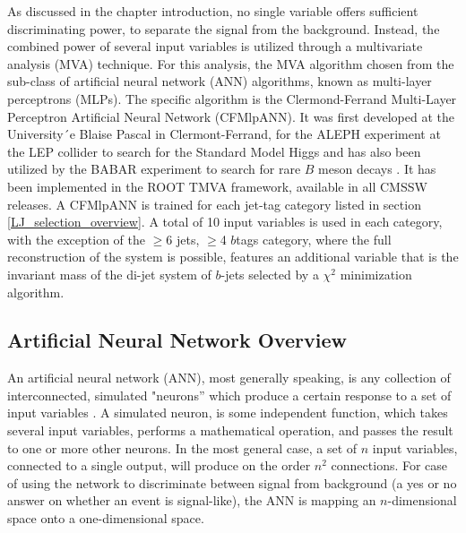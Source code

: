 \par As discussed in the chapter introduction, no single variable
offers sufficient discriminating power, to separate the \ttH signal
from the \ttjets background.  Instead, the combined power of several
input variables is utilized through a multivariate analysis (MVA)
technique.  For this analysis, the MVA algorithm chosen from the sub-class
of artificial neural network (ANN) algorithms, known as multi-layer
perceptrons (MLPs).  The specific algorithm is the Clermond-Ferrand
Multi-Layer Perceptron Artificial Neural Network (CFMlpANN).  It was
first developed at the University´e Blaise Pascal in Clermont-Ferrand,
for the ALEPH experiment at the LEP collider to search for the
Standard Model Higgs and has also been utilized by the BABAR
experiment to search for rare $B$ meson decays \cite{Hocker:2007ht}.
It has been implemented in the ROOT TMVA framework, available in all
CMSSW releases.  A CFMlpANN is trained for each jet-tag category
listed in section \ref{LJ_selection_overview}.  A total of 10 input
variables is used in each category, with the exception of the $\ge$6
jets, $\ge$4 $b$tags category, where the full reconstruction of the
\ttH system is possible, features an additional variable that is the
invariant mass of the di-jet system of $b$-jets selected by a
$\chi^{2}$ minimization algorithm.  

\subsection{Artificial Neural Network Overview}
\label{ann_overview}

\par An artificial neural network (ANN), most generally speaking, is
any collection of interconnected, simulated "neurons'' which produce a
certain response to a set of input variables \cite{Hocker:2007ht}.  A
simulated neuron, is some independent function, which takes several
input variables, performs a mathematical operation, and passes the
result to one or more other neurons.  In the most general case, a set
of $n$ input variables, connected to a single output, will produce on
the order $n^{2}$ connections.  For case of using the network to
discriminate between signal from background (a yes or no answer on
whether an event is signal-like), the ANN is mapping an
$n$-dimensional space onto a one-dimensional space.  

